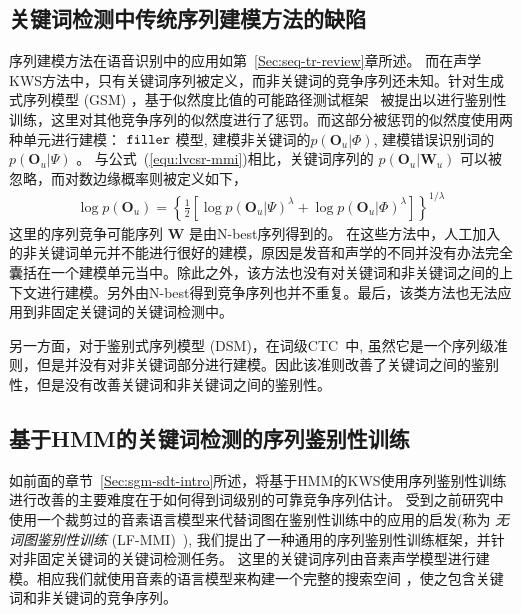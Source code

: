 \subsection{关键词检测中传统序列建模方法的缺陷}

序列建模方法在语音识别中的应用如第~\ref{Sec:seq-tr-review}章所述。
而在声学KWS方法中，只有关键词序列被定义，而非关键词的竞争序列还未知。针对生成式序列模型 (GSM) ，基于似然度比值的可能路径测试框架~\cite{sukkar1996utterance} 被提出以进行鉴别性训练，这里对其他竞争序列的似然度进行了惩罚。而这部分被惩罚的似然度使用两种单元进行建模： $\tt filler$ 模型, 建模非关键词的$p(\mathbf{O}_u|\Phi)$, 建模错误识别词的 $p(\mathbf{O}_u|\Psi)$ 。 与公式~(\ref{equ:lvcsr-mmi})相比，关键词序列的  $p(\mathbf{O}_u|\mathbf{W}_u)$ 可以被忽略，而对数边缘概率则被定义如下，
\begin{equation}
\label{equ:wbmve-po}
\begin{split}
\log p(\mathbf{O}_u)=\left\{\frac{1}{2}[\log p(\mathbf{O}_u|\Psi)^\lambda + \log p(\mathbf{O}_u|\Phi)^\lambda]\right\}^{1/\lambda}
\end{split}
\end{equation}
这里的序列竞争可能序列 $\mathbf{W}$ 是由N-best序列得到的。
在这些方法中，人工加入的非关键词单元并不能进行很好的建模，原因是发音和声学的不同并没有办法完全囊括在一个建模单元当中。除此之外，该方法也没有对关键词和非关键词之间的上下文进行建模。另外由N-best得到竞争序列也并不重复。最后，该类方法也无法应用到非固定关键词的关键词检测中。

另一方面，对于鉴别式序列模型 (DSM)，在词级CTC~\cite{fernandez2007application}中, 
虽然它是一个序列级准则，但是并没有对非关键词部分进行建模。因此该准则改善了关键词之间的鉴别性，但是没有改善关键词和非关键词之间的鉴别性。



\subsection{基于HMM的关键词检测的序列鉴别性训练}
\label{Sec:kws-disc-proposed}

如前面的章节~\ref{Sec:sgm-sdt-intro}所述，将基于HMM的KWS使用序列鉴别性训练进行改善的主要难度在于如何得到词级别的可靠竞争序列估计。
受到之前研究中使用一个裁剪过的音素语言模型来代替词图在鉴别性训练中的应用的启发(称为 {\em 无词图鉴别性训练} (LF-MMI)~\cite{povey2016purely,chen2006advances}), 我们提出了一种通用的序列鉴别性训练框架，并针对非固定关键词的关键词检测任务。
这里的关键词序列由音素声学模型进行建模。相应我们就使用音素的语言模型来构建一个完整的搜索空间 ，使之包含关键词和非关键词的竞争序列。

